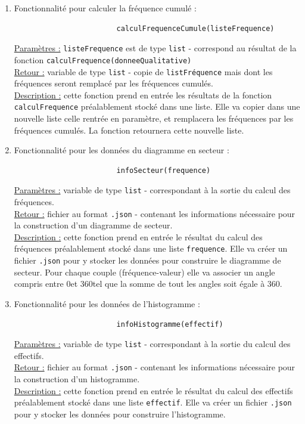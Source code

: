 \begin{enumerate}
				\vspace{1em}\item Fonctionnalité pour calculer la fréquence cumulé :
					\begin{lstlisting}
						calculFrequenceCumule(listeFrequence)
					\end{lstlisting}
					\underline{Paramètres :} \lstinline!listeFrequence! est de type \lstinline!list! - correspond au résultat de la fonction \lstinline!calculFrequence(donneeQualitative)! \\
					\underline{Retour :} variable de type  \lstinline!list! - copie de \lstinline!listFréquence! mais dont les fréquences seront remplacé par les fréquences cumulés. \\
					\underline{Description :} cette fonction prend en entrée les résultats de la fonction \lstinline!calculFrequence! préalablement stocké dans une liste. Elle va copier dans une nouvelle liste celle rentrée en paramètre, et remplacera les fréquences par les fréquences cumulés. La fonction retournera cette nouvelle liste.
					
				\vspace{1em}\item Fonctionnalité pour les données du diagramme en secteur :
					\begin{lstlisting}
						infoSecteur(frequence)
					\end{lstlisting}
					\underline{Paramètres :} variable de type  \lstinline!list! - correspondant à la sortie du calcul des fréquences.\\
					\underline{Retour :} fichier au format  \lstinline!.json! - contenant les informations nécessaire pour la construction d'un diagramme de secteur.\\
					\underline{Description :} cette fonction prend en entrée le résultat du calcul des fréquences préalablement stocké dans une liste \lstinline!frequence!. Elle va créer un fichier  \lstinline!.json!  pour y stocker les données pour construire le diagramme de secteur. Pour chaque couple (fréquence-valeur) elle va associer un angle compris entre 0\degre et 360\degre tel que la somme de tout les angles soit égale à 360\degre.
					
				\vspace{1em}\item Fonctionnalité pour les données de l'histogramme :
					\begin{lstlisting}
						infoHistogramme(effectif)
					\end{lstlisting}
					\underline{Paramètres :} variable de type  \lstinline!list! - correspondant à la sortie du calcul des effectifs.\\
					\underline{Retour :} fichier au format  \lstinline!.json! - contenant les informations nécessaire pour la construction d'un histogramme.\\
					\underline{Description :} cette fonction prend en entrée le résultat du calcul des effectifs préalablement stocké dans une liste \lstinline!effectif!. Elle va créer un fichier  \lstinline!.json! pour y stocker les données pour construire l'histogramme.
			\end{enumerate}
		
